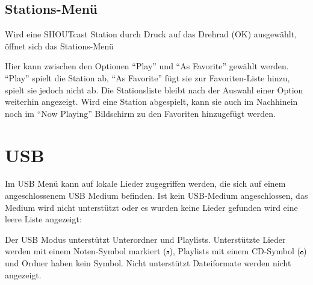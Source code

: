 \documentclass[12pt,a4paper,openany]{memoir}
\begin{document}
\subsection{Stations-Menü}
Wird eine SHOUTcast Station durch Druck auf das Drehrad (OK) ausgewählt, öffnet sich das Stations-Menü


Hier kann zwischen den Optionen ``Play'' und ``As Favorite'' gewählt werden. ``Play'' spielt die Station ab, ``As Favorite'' fügt sie zur Favoriten-Liste hinzu, spielt sie jedoch nicht ab. 
Die Stationsliste bleibt nach der Auswahl einer Option weiterhin angezeigt. Wird eine Station abgespielt, kann sie auch im Nachhinein noch im ``Now Playing'' Bildschirm zu den Favoriten hinzugefügt werden. 


\section{USB}
Im USB Menü kann auf lokale Lieder zugegriffen werden, die sich auf einem angeschlossenem USB Medium befinden. Ist kein USB-Medium angeschlossen, das Medium wird nicht unterstützt oder es wurden keine Lieder gefunden 
wird eine leere Liste angezeigt:


Der USB Modus unterstützt Unterordner und Playlists. Unterstützte Lieder werden mit einem Noten-Symbol markiert (\includegraphics[width=5px]{images/song.png}), 
Playlists mit einem CD-Symbol (\includegraphics[width=5px]{images/playlist.png}) und Ordner haben kein Symbol. Nicht unterstützt Dateiformate werden nicht angezeigt. 

\end{document}
